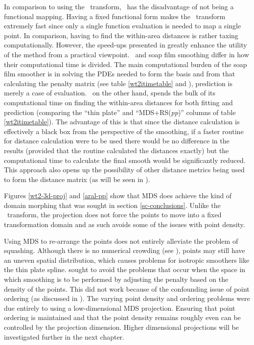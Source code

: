 In comparison to using the \sch\ transform, \mdsap\ has the disadvantage of not being a functional mapping. Having a fixed functional form makes the \sch\ transform extremely fast since only a single function evaluation is needed to map a single point. In comparison, having to find the within-area distances is rather taxing computationally. However, the speed-ups presented in  greatly enhance the utility of the method from a practical viewpoint. \mdsap\ and soap film smoothing differ in how their computational time is divided. The main computational burden of the soap film smoother is in solving the PDEs needed to form the basis and from that calculating the penalty matrix (see table \ref{wt2itimetable} and ), prediction is merely a case of evaluation. \mdsap\ on the other hand, spends the bulk of its computational time on finding the within-area distances for both fitting and prediction (comparing the ``thin plate'' and ``MDS+RS(\textit{pp})'' columns of table \ref{wt2itimetable}). The advantage of this is that since the distance calculation is effectively a black box from the perspective of the smoothing, if a faster routine for distance calculation were to be used there would be no difference in the results (provided that the routine calculated the distances exactly) but the computational time to calculate the final smooth would be significantly reduced. This approach also opens up the possibility of other distance metrics being used to form the distance matrix (as will be seen in ).

Figures \ref{wt2-3d-proj} and \ref{aral-pp} show that MDS does achieve the kind of domain morphing that was sought in section \ref{sc-conclusions}. Unlike the \sch\ transform, the projection does not force the points to move into a fixed transformation domain \label{cor-r47}and as such avoids some of the issues with point density. 

Using MDS to re-arrange the points does not entirely alleviate the problem of squashing. Although there is no numerical crowding (see ), points may still have an uneven spatial distribution, which causes problems for isotropic smoothers like the thin plate spline.  sought to avoid the problems that occur when the space in which smoothing is to be performed by adjusting the penalty based on the density of the points. This did not work because of the confounding issue of point ordering (as discussed in ). The varying point density and ordering problems were due entirely to using a low-dimensional MDS projection. Ensuring that point ordering is maintained and that the point density remains roughly even can be controlled by the projection dimension. Higher dimensional projections will be investigated further in the next chapter.

